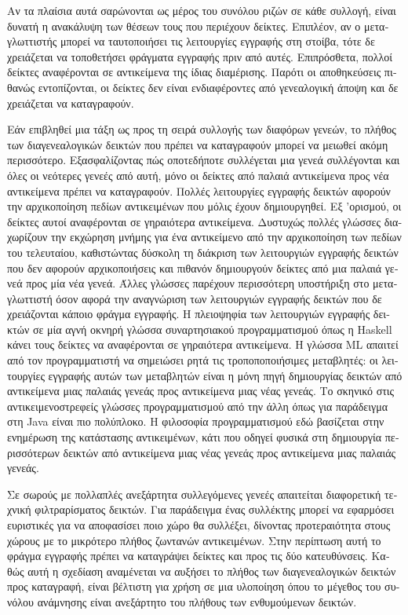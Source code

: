 \begin{greek}
Αν τα πλαίσια αυτά σαρώνονται ως μέρος του συνόλου ριζών σε
κάθε συλλογή, είναι δυνατή η ανακάλυψη των θέσεων τους που
περιέχουν δείκτες. Επιπλέον, αν ο μεταγλωττιστής μπορεί να
ταυτοποιήσει τις λειτουργίες εγγραφής στη στοίβα, τότε δε
χρειάζεται να τοποθετήσει φράγματα εγγραφής πριν από αυτές.
Επιπρόσθετα, πολλοί δείκτες αναφέρονται σε αντικείμενα της
ίδιας διαμέρισης. Παρότι οι αποθηκεύσεις πιθανώς εντοπίζονται,
οι δείκτες δεν είναι ενδιαφέροντες από γενεαλογική άποψη και
δε χρειάζεται να καταγραφούν.

Εάν επιβληθεί μια τάξη ως προς τη σειρά συλλογής των διαφόρων
γενεών, το πλήθος των διαγενεαλογικών δεικτών που πρέπει να
καταγραφούν μπορεί να μειωθεί ακόμη περισσότερο. Εξασφαλίζοντας
πώς οποτεδήποτε συλλέγεται μια γενεά συλλέγονται και όλες οι
νεότερες γενεές από αυτή, μόνο οι δείκτες από παλαιά αντικείμενα
προς νέα αντικείμενα πρέπει να καταγραφούν. Πολλές λειτουργίες
εγγραφής δεικτών αφορούν την αρχικοποίηση πεδίων αντικειμένων
που μόλις έχουν δημιουργηθεί. Εξ 'ορισμού, οι δείκτες αυτοί
αναφέρονται σε γηραιότερα αντικείμενα. Δυστυχώς πολλές γλώσσες
διαχωρίζουν την εκχώρηση μνήμης για ένα αντικείμενο από την
αρχικοποίηση των πεδίων του τελευταίου, καθιστώντας δύσκολη τη
διάκριση των λειτουργιών εγγραφής δεικτών που δεν αφορούν
αρχικοποιήσεις και πιθανόν δημιουργούν δείκτες από μια παλαιά
γενεά προς μία νέα γενεά. Άλλες γλώσσες παρέχουν περισσότερη
υποστήριξη στο μεταγλωττιστή όσον αφορά την αναγνώριση των
λειτουργιών εγγραφής δεικτών που δε χρειάζονται κάποιο φράγμα
εγγραφής. Η πλειοψηφία των λειτουργιών εγγραφής δεικτών σε μία
αγνή οκνηρή γλώσσα συναρτησιακού προγραμματισμού όπως η Haskell
κάνει τους δείκτες να αναφέρονται σε γηραιότερα αντικείμενα.
Η γλώσσα ML απαιτεί από τον προγραμματιστή να σημειώσει ρητά
τις τροποποποιήσιμες μεταβλητές: οι λειτουργίες εγγραφής αυτών
των μεταβλητών είναι η μόνη πηγή δημιουργίας δεικτών από
αντικείμενα μιας παλαιάς γενεάς προς αντικείμενα μιας νέας
γενεάς. Το σκηνικό στις αντικειμενοστρεφείς γλώσσες προγραμματισμού
από την άλλη όπως για παράδειγμα στη Java είναι πιο πολύπλοκο.
Η φιλοσοφία προγραμματισμού εδώ βασίζεται στην ενημέρωση της
κατάστασης αντικειμένων, κάτι που οδηγεί φυσικά στη δημιουργία
περισσότερων δεικτών από αντικείμενα μιας νέας γενεάς προς
αντικείμενα μιας παλαιάς γενεάς.

Σε σωρούς με πολλαπλές ανεξάρτητα συλλεγόμενες γενεές απαιτείται
διαφορετική τεχνική φιλτραρίσματος δεικτών. Για παράδειγμα ένας
συλλέκτης μπορεί να εφαρμόσει ευριστικές για να αποφασίσει
ποιο χώρο θα συλλέξει, δίνοντας προτεραιότητα στους χώρους
με το μικρότερο πλήθος ζωντανών αντικειμένων. Στην περίπτωση
αυτή το φράγμα εγγραφής πρέπει να καταγράψει δείκτες και προς
τις δύο κατευθύνσεις. Καθώς αυτή η σχεδίαση αναμένεται να αυξήσει
το πλήθος των διαγενεαλογικών δεικτών προς καταγραφή, είναι
βέλτιστη για χρήση σε μια υλοποίηση όπου το μέγεθος του συνόλου
ανάμνησης είναι ανεξάρτητο του πλήθους των ενθυμούμενων
δεικτών.


\end{greek}
